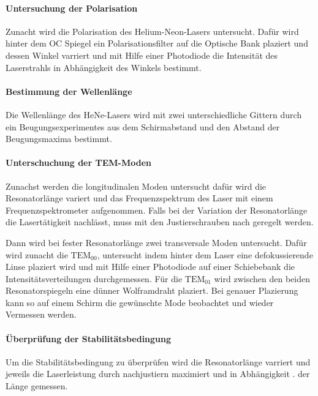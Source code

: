 \paragraph{ Untersuchung der Polarisation}
Zunacht wird die Polarisation des Helium-Neon-Lasers
untersucht. Dafür wird hinter dem OC Spiegel ein
Polarisationsfilter auf die Optische Bank
plaziert und dessen Winkel varriert und mit Hilfe einer Photodiode
die Intensität des Laserstrahls in Abhängigkeit des Winkels bestimmt.

\paragraph{Bestimmung der Wellenlänge}
Die Wellenlänge des HeNe-Lasers wird mit zwei unterschiedliche
Gittern durch ein Beugungsexperimentes aus dem Schirmabstand
und den Abstand der Beugungsmaxima bestimmt.

\paragraph{Unterschuchung der TEM-Moden}
Zunachst werden die longitudinalen Moden untersucht dafür
wird die Resonatorlänge variert und das Frequenzspektrum des Laser
mit einem Frequenzspektrometer aufgenommen.
Falls bei der Variation der Resonatorlänge die Lasertätigkeit
nachlässt, muss mit den Justierschrauben nach geregelt werden.

Dann wird bei fester Resonatorlänge zwei transversale Moden untersucht.
Dafür wird zunacht die $\text{TEM}_{00}$, untersucht indem hinter dem
Laser eine defokussierende Linse plaziert wird und mit Hilfe einer
Photodiode auf einer Schiebebank die Intensitätsverteilungen
durchgemessen.
Für die $\text{TEM}_{01}$ wird zwischen den beiden Resonatorspiegeln
eine dünner Wolframdraht plaziert. Bei genauer Plazierung kann so auf
einem Schirm die gewünschte Mode beobachtet
und wieder Vermessen werden.


\paragraph{Überprüfung der Stabilitätsbedingung}
Um die Stabilitätsbedingung zu überprüfen
wird die Resonatorlänge varriert und jeweils
die Laserleistung durch nachjustiern maximiert und in Abhängigkeit .
der Länge gemessen.
